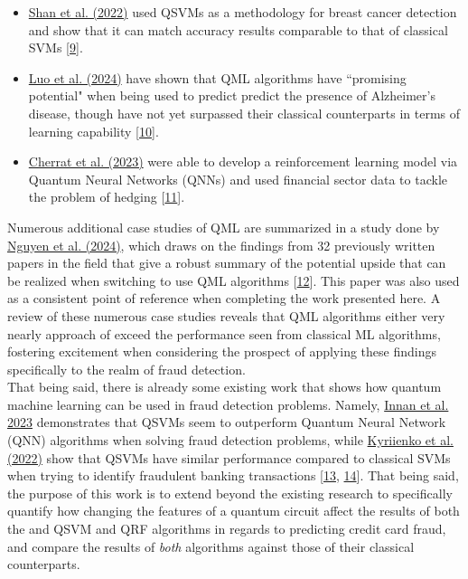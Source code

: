 \documentclass[11pt, oneside]{article}   	%
\begin{document}
\begin{itemize}

	\item \href{https://doi.org/10.21203/rs.3.rs-1434074/v1}{Shan et al. (2022)} used QSVMs as a methodology for breast cancer detection and show that it can match accuracy results comparable to that of classical SVMs [\href{https://doi.org/10.21203/rs.3.rs-1434074/v1}{9}].
	\item \href{https://doi.org/10.48550/arXiv.2408.04543}{Luo et al. (2024)} have shown that QML algorithms have ``promising potential" when being used to predict predict the presence of Alzheimer's disease, though have not yet surpassed their classical counterparts in terms of learning capability [\href{https://doi.org/10.48550/arXiv.2408.04543}{10}].  
	\item \href{https://doi.org/10.22331/q-2023-11-29-1191}{Cherrat et al. (2023)} were able to develop a reinforcement learning model via Quantum Neural Networks (QNNs) and used financial sector data to tackle the problem of hedging [\href{https://doi.org/10.22331/q-2023-11-29-1191}{11}]. 

\end{itemize}

\noindent\hspace{10mm}Numerous additional case studies of QML are summarized in a study done by \href{https://doi.org/10.34190/eccws.23.1.2258}{Nguyen et al. (2024)}, which draws on the findings from 32 previously written papers in the field that give a robust summary of the potential upside that can be realized when switching to use QML algorithms [\href{https://doi.org/10.34190/eccws.23.1.2258}{12}]. This paper was also used as a consistent point of reference when completing the work presented here. A review of these numerous case studies reveals that QML algorithms either very nearly approach of exceed the performance seen from classical ML algorithms, fostering excitement when considering the prospect of applying these findings specifically to the realm of fraud detection. \\

\noindent\hspace{10mm}That being said, there is already some existing work that shows how quantum machine learning can be used in fraud detection problems. Namely, \href{https://doi.org/10.1142/S0219749923500442}{Innan et al. 2023} demonstrates that QSVMs seem to outperform Quantum Neural Network (QNN) algorithms when solving fraud detection problems, while \href{https://arxiv.org/abs/2208.01203}{Kyriienko et al. (2022)} show that QSVMs have similar performance compared to classical SVMs when trying to identify fraudulent banking transactions [\href{https://doi.org/10.1142/S0219749923500442}{13}, \href{https://doi.org/10.48550/arXiv.2208.01203}{14}]. That being said, the purpose of this work is to extend beyond the existing research to specifically quantify how changing the features of a quantum circuit affect the results of both the and QSVM and QRF algorithms in regards to predicting credit card fraud, and compare the results of \textit{both} algorithms against those of their classical counterparts.\\
\end{document}
